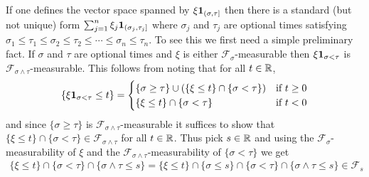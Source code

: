 If one defines the vector space spanned by $\xi \textbf{1}_{(\sigma, \tau]}$ then there is a standard (but not unique) form $\sum_{j=1}^n \xi_j \textbf{1}_{(\sigma_j, \tau_j]}$ where $\sigma_j$ and $\tau_j$ are optional times satisfying $\sigma_1 \leq \tau_1 \leq \sigma_2 \leq \tau_2 \leq \dotsb \leq \sigma_n \leq \tau_n$.  To see this we first need a simple preliminary fact.  If $\sigma$ and $\tau$ are optional times and $\xi$ is either $\mathcal{F}_\sigma$-measurable then $\xi \textbf{1}_{\sigma < \tau}$ is $\mathcal{F}_{\sigma \wedge \tau}$-measurable.  This follows from noting that for all $t \in \mathbb{R}$, 
\begin{align*}
\lbrace \xi \textbf{1}_{\sigma < \tau} \leq t \rbrace = 
\begin{cases}
\lbrace \sigma \geq \tau \rbrace \cup ( \lbrace \xi \leq t \rbrace \cap \lbrace \sigma < \tau \rbrace) & \text{if $t \geq 0$} \\
\lbrace \xi \leq t \rbrace \cap \lbrace \sigma < \tau \rbrace & \text{if $t < 0$} \\
\end{cases}
\end{align*}
and since $\lbrace \sigma \geq \tau \rbrace$ is $\mathcal{F}_{\sigma \wedge \tau}$-measurable it suffices to show that $\lbrace \xi \leq t \rbrace \cap \lbrace \sigma < \tau \rbrace \in \mathcal{F}_{\sigma \wedge \tau}$ for all $t \in \mathbb{R}$.  Thus pick $s \in \mathbb{R}$ and using the $\mathcal{F}_\sigma$-measurability of $\xi$ and the $\mathcal{F}_{\sigma \wedge \tau}$-measurability of $\lbrace \sigma < \tau \rbrace$ we get
\begin{align*}
\lbrace \xi \leq t \rbrace \cap \lbrace \sigma < \tau \rbrace \cap \lbrace \sigma \wedge \tau \leq s \rbrace = 
\lbrace \xi \leq t \rbrace \cap \lbrace \sigma \leq s \rbrace \cap \lbrace \sigma < \tau \rbrace \cap \lbrace \sigma \wedge \tau \leq s \rbrace \in \mathcal{F}_s
\end{align*}

